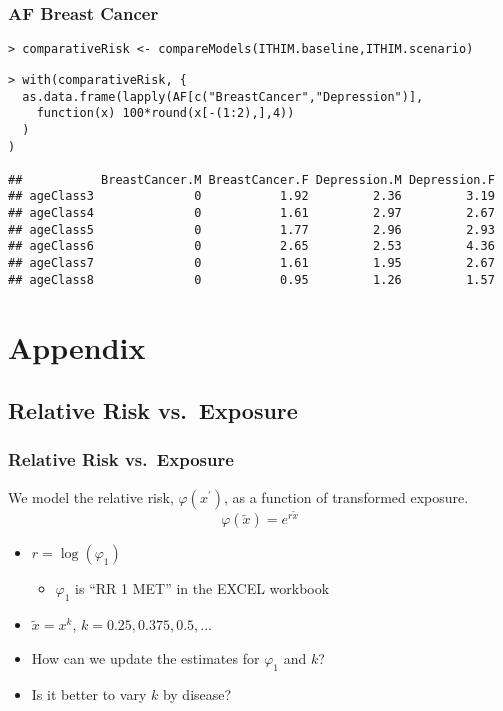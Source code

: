 \documentclass[handout,13pt,compress,c]{beamer}
\newcommand{\bi}{\begin{itemize}}
\newcommand{\ei}{\end{itemize}}
\begin{document}
\begin{frame}[fragile]
\frametitle{AF Breast Cancer}
\begin{semiverbatim}
\begin{lstlisting}
> comparativeRisk <- compareModels(ITHIM.baseline,ITHIM.scenario)
\end{lstlisting}
\end{semiverbatim}
\begin{semiverbatim}
\begin{lstlisting}
> with(comparativeRisk, {
  as.data.frame(lapply(AF[c("BreastCancer","Depression")],
    function(x) 100*round(x[-(1:2),],4))
  )
)

##           BreastCancer.M BreastCancer.F Depression.M Depression.F
## ageClass3              0           1.92         2.36         3.19
## ageClass4              0           1.61         2.97         2.67
## ageClass5              0           1.77         2.96         2.93
## ageClass6              0           2.65         2.53         4.36
## ageClass7              0           1.61         1.95         2.67
## ageClass8              0           0.95         1.26         1.57
\end{lstlisting}
\end{semiverbatim}
\end{frame}
\section{Appendix}
\subsection{Relative Risk vs.\ Exposure}
\begin{frame}[fragile]
\label{RR}
\frametitle{Relative Risk vs.\ Exposure}
We model the relative risk, $\varphi(x^\prime)$, as a function of
transformed exposure.
\begin{equation}
\varphi\left(\tilde{x}\right) = e^{r \tilde{x}}
\end{equation}
\bi
\item $r=\log\left(\varphi_1\right)$ \bi\item$\varphi_1$ is ``RR 1 MET'' in the EXCEL workbook\ei
\item $\tilde{x}=x^k$, $k=0.25,0.375,0.5,\ldots$
\ei
\bi
\item How can we update the estimates for $\varphi_1$ and $k$?
\item Is it better to vary $k$ by disease?\ei
\end{frame}
\end{document}
